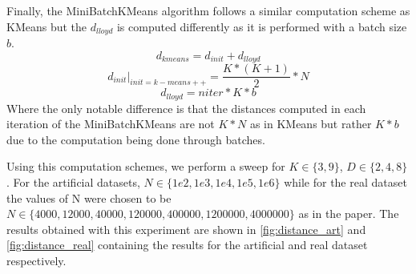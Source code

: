 Finally, the MiniBatchKMeans algorithm follows a similar computation scheme as KMeans but the $d_{lloyd}$ is computed differently as it is performed with a batch size $b$.
$$d_{kmeans} = d_{init} + d_{lloyd}$$
$$d_{init} \bigg\rvert_{init=k-means++} = \frac{K*(K+1)}{2} * N$$
$$d_{lloyd} = niter * K * b$$
Where the only notable difference is that the distances computed in each iteration of the MiniBatchKMeans are not $K*N$ as in KMeans but rather $K*b$ due to the computation being done through batches.

Using this computation schemes, we perform a sweep for $K \in \{3, 9\}$, $D \in \{2, 4, 8\}$. For the artificial datasets, $N \in \{1e2, 1e3, 1e4, 1e5, 1e6\}$ while for the real dataset the values of N were chosen to be $N \in \{4000, 12000, 40000, 120000, 400000, 1200000, 4000000\}$ as in the paper. The results obtained with this experiment are shown in \ref{fig:distance_art} and \ref{fig:distance_real} containing the results for the artificial and real dataset respectively.

